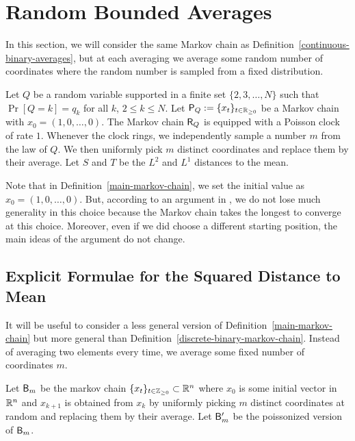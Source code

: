\documentclass[12pt]{article}
\begin{document}
\section{Random Bounded Averages}

In this section, we will consider the same Markov chain as Definition~\ref{continuous-binary-averages}, but at each averaging we average some random number of coordinates where the random number is sampled from a fixed distribution. 

\begin{defn} \label{main-markov-chain}
	Let $Q$ be a random variable supported in a finite set $\{2, 3, \ldots, N\}$ such that $\Pr[Q = k] = q_k$ for all $k$, $2 \leq k \leq N$. Let $\mathsf{P}_Q := \{x_t\}_{t \in \mathbb{R}_{\geq 0}}$ be a Markov chain with $x_0 = (1, 0, \ldots, 0)$. The Markov chain $\mathsf{R}_Q$ is equipped with a Poisson clock of rate $1$. Whenever the clock rings, we independently sample a number $m$ from the law of $Q$. We then uniformly pick $m$ distinct coordinates and replace them by their average. Let $S$ and $T$ be the $L^2$ and $L^1$ distances to the mean. 
\end{defn} 

Note that in Definition~\ref{main-markov-chain}, we set the initial value as $x_0 = (1, 0, \ldots, 0)$. But, according to an argument in \cite{chatterjee2021phase}, we do not lose much generality in this choice because the Markov chain takes the longest to converge at this choice. Moreover, even if we did choose a different starting position, the main ideas of the argument do not change.

\subsection{Explicit Formulae for the Squared Distance to Mean} 

It will be useful to consider a less general version of Definition~\ref{main-markov-chain} but more general than Definition~\ref{discrete-binary-markov-chain}. Instead of averaging two elements every time, we average some fixed number of coordinates $m$. 

\begin{defn}
	Let $\mathsf{B}_m$ be the markov chain $\{x_t\}_{t \in \mathbb{Z}_{\geq 0} } \subset \mathbb{R}^n$ where $x_0$ is some initial vector in $\mathbb{R}^n$ and $x_{k+1}$ is obtained from $x_k$ by uniformly picking $m$ distinct coordinates at random and replacing them by their average. Let $\mathsf{B}_m'$ be the poissonized version of $\mathsf{B}_m$. 
\end{defn}
\end{document}
